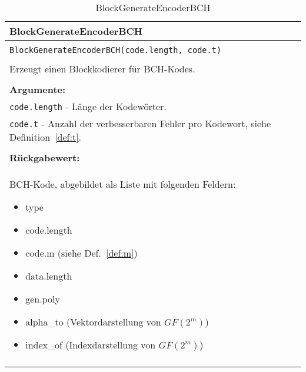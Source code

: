\begin{longtable}{|p{\textwidth}|}
\hline
\rowcolor{lightblue}
BlockGenerateEncoderBCH
\\
\hline
\\
\texttt{BlockGenerateEncoderBCH(code.length, code.t)}\\
\\
Erzeugt einen Blockkodierer für BCH-Kodes.\\
\\
\textbf{Argumente:}\\
\texttt{code.length} - Länge der Kodewörter.\\
\texttt{code.t} - Anzahl der verbesserbaren Fehler pro Kodewort, siehe Definition~\ref{def:t}.\\
\\
\textbf{Rückgabewert:}\\
BCH-Kode, abgebildet als Liste mit folgenden Feldern:
\vspace{4mm}
\begin{itemize}
\renewcommand\labelitemi{--}
\itemsep-.5em %
\item type
\item code.length
\item code.m (siehe Def.~\ref{def:m})
\item data.length
\item gen.poly
\item alpha\_to (Vektordarstellung von $GF(2^m)$)
\item index\_of	(Indexdarstellung von $GF(2^m)$)
\end{itemize}
\\
\hline
\caption{BlockGenerateEncoderBCH}
\end{longtable}